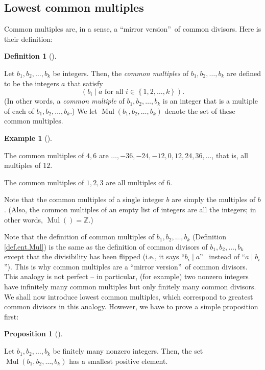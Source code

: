 \documentclass[numbers=enddot,12pt,final,onecolumn,notitlepage]{scrartcl}%
\numberwithin{exer}{subsection}
\theoremstyle{definition}
\newtheorem{prop}[theo]{Proposition}
\newenvironment{proposition}[1][]
{\begin{prop}[#1]\begin{leftbar}}
{\end{leftbar}\end{prop}}
\newtheorem{defi}[theo]{Definition}
\newenvironment{definition}[1][]
{\begin{defi}[#1]\begin{leftbar}}
{\end{leftbar}\end{defi}}
\newtheorem{exam}[theo]{Example}
\newenvironment{example}[1][]
{\begin{exam}[#1]\begin{leftbar}}
{\end{leftbar}\end{exam}}
\begin{document}
\subsection{Lowest common multiples}

Common multiples are, in a sense, a \textquotedblleft mirror
version\textquotedblright\ of common divisors. Here is their definition:

\begin{definition}
\label{def.ent.Mul}Let $b_{1},b_{2},\ldots,b_{k}$ be integers. Then, the
\textit{common multiples} of $b_{1},b_{2},\ldots,b_{k}$ are defined to be the
integers $a$ that satisfy%
\[
\left(  b_{i}\mid a\text{ for all }i\in\left\{  1,2,\ldots,k\right\}  \right)
.
\]
(In other words, a \textit{common multiple} of $b_{1},b_{2},\ldots,b_{k}$ is
an integer that is a multiple of each of $b_{1},b_{2},\ldots,b_{k}$.) We let
$\operatorname*{Mul}\left(  b_{1},b_{2},\ldots,b_{k}\right)  $ denote the set
of these common multiples.
\end{definition}

\begin{example}
The common multiples of $4,6$ are $\ldots,-36,-24,-12,0,12,24,36,\ldots$, that
is, all multiples of $12$.

The common multiples of $1,2,3$ are all multiples of $6$.
\end{example}

Note that the common multiples of a single integer $b$ are simply the
multiples of $b$. (Also, the common multiples of an empty list of integers are
all the integers; in other words, $\operatorname*{Mul}\left(  {}\right)
=\mathbb{Z}$.)

Note that the definition of common multiples of $b_{1},b_{2},\ldots,b_{k}$
(Definition \ref{def.ent.Mul}) is the same as the definition of common
divisors of $b_{1},b_{2},\ldots,b_{k}$ except that the divisibility has been
flipped (i.e., it says \textquotedblleft$b_{i}\mid a$\textquotedblright%
\ instead of \textquotedblleft$a\mid b_{i}$\textquotedblright). This is why
common multiples are a \textquotedblleft mirror version\textquotedblright\ of
common divisors. This analogy is not perfect -- in particular, (for example)
two nonzero integers have infinitely many common multiples but only finitely
many common divisors. We shall now introduce lowest common multiples, which
correspond to greatest common divisors in this analogy. However, we have to
prove a simple proposition first:

\begin{proposition}
\label{prop.ent.Mul.exi}Let $b_{1},b_{2},\ldots,b_{k}$ be finitely many
nonzero integers. Then, the set $\operatorname*{Mul}\left(  b_{1},b_{2}%
,\ldots,b_{k}\right)  $ has a smallest positive element.
\end{proposition}
\end{document}
